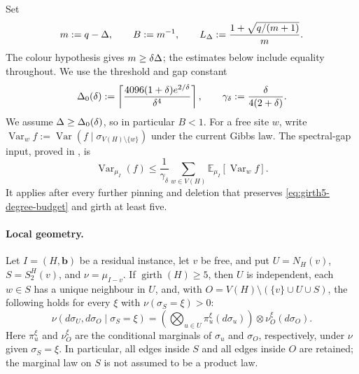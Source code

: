Set
\begin{equation}\label{eq:girth5-basic-constants}
 m:=q-\Delta,\qquad B:=m^{-1},\qquad
 L_\Delta:=\frac{1+\sqrt{q/(m+1)}}{m}.
\end{equation}
The colour hypothesis gives $m\ge\delta\Delta$; the estimates below include
equality throughout.
We use the threshold and gap constant
\begin{equation}\label{eq:girth5-gap-constants}
 \Delta_0(\delta):=\left\lceil
 \frac{4096(1+\delta)e^{2/\delta}}{\delta^4}\right\rceil,
 \qquad \gamma_\delta:=\frac{\delta}{4(2+\delta)}.
\end{equation}
We assume $\Delta\ge\Delta_0(\delta)$, so in particular $B<1$.
For a free site $w$, write
$\operatorname{Var}_w f:=\operatorname{Var}(f\mid
\sigma_{V(H)\setminus\{w\}})$ under the current Gibbs law.
The spectral-gap input, proved in , is
\begin{equation}\label{eq:girth5-poincare}
 \operatorname{Var}_{\mu_I}(f)
 \le\frac1{\gamma_\delta}\sum_{w\in V(H)}
       \mathbb E_{\mu_I}[\operatorname{Var}_w f].
\end{equation}
It applies after every further pinning and deletion that preserves
\eqref{eq:girth5-degree-budget} and girth at least five.

\paragraph{Local geometry.}

\begin{lemma}
\label{lem:girth5-disintegration}
Let $I=(H,\mathbf b)$ be a residual instance, let $v$ be free, and put
$U=N_H(v)$, $S=S_2^H(v)$, and $\nu=\mu_{I-v}$.  If $\operatorname{girth}(H)\ge5$, then $U$ is independent,
each $w\in S$ has a unique neighbour in $U$, and, with
$O=V(H)\setminus(\{v\}\cup U\cup S)$, the following holds for every
$\xi$ with $\nu(\sigma_S=\xi)>0$:
\begin{equation}\label{eq:girth5-disintegration}
 \nu(d\sigma_U,d\sigma_O\mid\sigma_S=\xi)
 =\left(\bigotimes_{u\in U}\pi_u^\xi(d\sigma_u)\right)
   \otimes\nu_O^\xi(d\sigma_O).
\end{equation}
Here $\pi_u^\xi$ and $\nu_O^\xi$ are the conditional marginals of
$\sigma_u$ and $\sigma_O$, respectively, under $\nu$ given $\sigma_S=\xi$.
In particular, all edges inside $S$ and all edges inside $O$ are retained;
the marginal law on $S$ is not assumed to be a product law.
\end{lemma}

